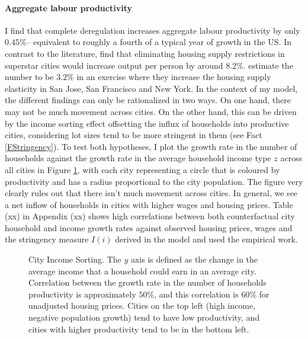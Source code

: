\documentclass[11pt]{article}
\begin{document}
\paragraph*{Aggregate labour productivity} I find that complete deregulation increases aggregate labour productivity by only $0.45 \%$-- equivalent to roughly a fourth of a typical year of growth in the US. In contrast to the literature, \cite{durantonpugaurbgrowth} find that eliminating housing supply restrictions in superstar cities would increase output per person by around $8.2\%$. \cite{hseihmoretti} estimate the number to be $3.2\%$ in an exercise where they increase the housing supply elasticity in San Jose, San Francisco and New York. In the context of my model, the different findings can only be rationalized in two ways. On one hand, there may not be much movement across cities. On the other hand, this can be driven by the income sorting effect offsetting the influx of households into productive cities, considering lot sizes tend to be more stringent in them (see Fact \ref{FStringency}). To test both hypotheses, I plot the growth rate in the number of households against the growth rate in the average household income type $z$ across all cities in Figure \ref{figure:city_inc_sorting}, with each city representing a circle that is coloured by productivity and has a radius proportional to the city population. The figure very clearly rules out that there isn't much movement across cities. In general, we see a net inflow of households in cities with higher wages and housing prices. Table (xx) in Appendix (xx) shows high correlations between both counterfactual city household and income growth rates against observed housing prices, wages and the stringency measure $I(i)$ derived in the model and used the empirical work. 

\begin{figure}[htbp!]
	
	
	\caption{City Income Sorting. The $y$ axis is defined as the change in the average income that a household could earn in an average city. Correlation between the growth rate in the number of households productivity is approximately $50\%$, and this correlation is $60\%$ for unadjusted housing prices.  Cities on the top left (high income, negative population growth) tend to have low productivity, and cities with higher productivity tend to be in the bottom left.}\label{figure:city_inc_sorting}
	
\end{figure}
\end{document}
